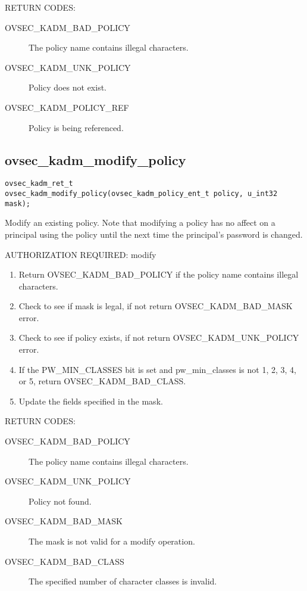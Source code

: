 RETURN CODES:

\begin{description}
\item[OVSEC_KADM_BAD_POLICY] The policy name contains illegal characters.
\item[OVSEC_KADM_UNK_POLICY] Policy does not exist.
\item[OVSEC_KADM_POLICY_REF] Policy is being referenced. 
\end{description}

\subsection{ovsec_kadm_modify_policy}

\begin{verbatim}
ovsec_kadm_ret_t
ovsec_kadm_modify_policy(ovsec_kadm_policy_ent_t policy, u_int32 mask);
\end{verbatim}

Modify an existing policy.  Note that modifying a policy has no affect
on a principal using the policy until the next time the principal's
password is changed.

AUTHORIZATION REQUIRED: modify

\begin{enumerate}
\item Return OVSEC_KADM_BAD_POLICY if the policy name contains illegal
characters.
\item Check to see if mask is legal, if not return OVSEC_KADM_BAD_MASK error.
\item Check to see if policy exists, if not return
OVSEC_KADM_UNK_POLICY error.
\item If the PW_MIN_CLASSES bit is set and pw_min_classes is not 1, 2,
3, 4, or 5, return OVSEC_KADM_BAD_CLASS.
\item Update the fields specified in the mask.
\end{enumerate}

RETURN CODES: 

\begin{description}
\item[OVSEC_KADM_BAD_POLICY] The policy name contains illegal characters.
\item[OVSEC_KADM_UNK_POLICY] Policy not found.
\item[OVSEC_KADM_BAD_MASK] The mask is not valid for a modify
operation.
\item[OVSEC_KADM_BAD_CLASS] The specified number of character classes
is invalid.
\end{description}

